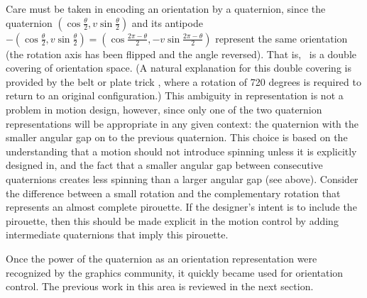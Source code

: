 \documentclass[12pt]{article}
\begin{document}
Care must be taken in encoding an orientation by a quaternion,
since the quaternion $(\cos \frac{\theta}{2}, v \sin \frac{\theta}{2})$
and its antipode $-(\cos \frac{\theta}{2}, v \sin \frac{\theta}{2}) 
= (\cos \frac{2\pi - \theta}{2}, -v \sin \frac{2\pi - \theta}{2})$
represent the same orientation
(the rotation axis has been flipped and the angle reversed).
That is, \ is a double covering of orientation space.
(A natural explanation for this double covering is provided by the belt or plate trick
\cite{hart94}, where a rotation of 720 degrees is required to return to an
original configuration.)
This ambiguity in representation is not a problem in motion design, however,
since only one of the two quaternion representations will be appropriate 
in any given context:
the quaternion with the smaller angular gap on  to the previous quaternion.
This choice is based on the understanding that 
a motion should not introduce spinning unless it is explicitly designed in,
and the fact that a smaller angular gap between consecutive quaternions
creates less spinning than a larger angular gap (see above).
Consider the difference between a small rotation and the complementary
rotation that represents an almost complete pirouette.
If the designer's intent is to include the pirouette, then this should be
made explicit in the motion control by adding intermediate quaternions
that imply this pirouette.


Once the power of the quaternion as an orientation representation
were recognized by the graphics community, it quickly became used 
for orientation control.
The previous work in this area is reviewed in the next section.
\end{document}

